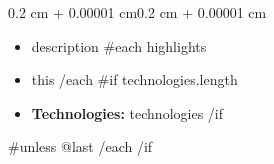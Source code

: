 \documentclass[10pt, letterpaper]{article}
\newenvironment{highlights}{
    \begin{itemize}[
        topsep=0.10 cm,
        parsep=0.10 cm,
        partopsep=0pt,
        itemsep=0pt,
        leftmargin=0.4 cm + 10pt
    ]
}{
    \end{itemize}
}
\newenvironment{onecolentry}{
    \begin{adjustwidth}{0.2 cm + 0.00001 cm}{0.2 cm + 0.00001 cm}
}{
    \end{adjustwidth}
}
\begin{document}
    \vspace{0.10 cm}
    \begin{onecolentry}
        \begin{highlights}
            \item {{description}}
            {{#each highlights}}
            \item {{this}}
            {{/each}}
            {{#if technologies.length}}
            \item \textbf{Technologies:} {{technologies}}
            {{/if}}
        \end{highlights}
    \end{onecolentry}
    {{#unless @last}}
    {{/each}}
    {{/if}}
\end{document}
